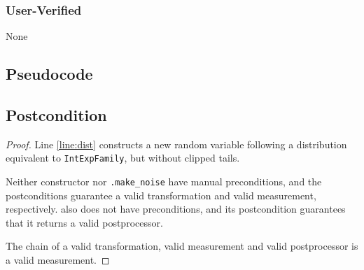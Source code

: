 \documentclass{article}
\begin{document}
\subsubsection*{User-Verified}
None

\subsection*{Pseudocode}


\subsection*{Postcondition}
\begin{theorem}
\end{theorem}

\begin{proof}
    Line \ref{line:dist} constructs a new random variable following a distribution equivalent to \texttt{IntExpFamily}, 
    but without clipped tails.

    Neither constructor  nor
    \texttt{.make\_noise} have manual preconditions, 
    and the postconditions guarantee a valid transformation and valid measurement, respectively.
     also does not have preconditions,
    and its postcondition guarantees that it returns a valid postprocessor.

    The chain of a valid transformation, valid measurement and valid postprocessor is a valid measurement.
\end{proof}
\end{document}
